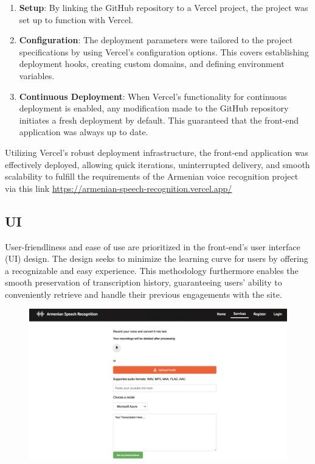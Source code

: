 \documentclass[conference]{IEEEtran}
\begin{document}
\begin{enumerate}
    \item\textbf{Setup}:  By linking the GitHub repository to a Vercel project, the project was set up to function with Vercel. 
    
    \item \textbf{Configuration}: The deployment parameters were tailored to the project specifications by using Vercel's configuration options. This covers establishing deployment hooks, creating custom domains, and defining environment variables.
    
    \item \textbf{Continuous Deployment}: When Vercel's functionality for continuous deployment is enabled, any modification made to the GitHub repository initiates a fresh deployment by default. This guaranteed that the front-end application was always up to date.
\end{enumerate}

Utilizing Vercel's robust deployment infrastructure, the front-end application was effectively deployed, allowing quick iterations, uninterrupted delivery, and smooth scalability to fulfill the requirements of the Armenian voice recognition project via this link \url{https://armenian-speech-recognition.vercel.app/}

\subsection{UI}
User-friendliness and ease of use are prioritized in the front-end's user interface (UI) design. The design seeks to minimize the learning curve for users by offering a recognizable and easy experience. This methodology furthermore enables the smooth preservation of transcription history, guaranteeing users' ability to conveniently retrieve and handle their previous engagements with the site.

\begin{figure}[ht]
\centering
\includegraphics[width=\textwidth]{Services.png}
    \label{fig:ui_design_3}

\end{figure}
\end{document}
